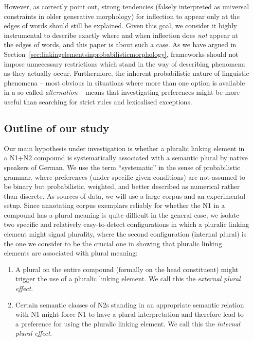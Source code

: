 However, as \citet[5]{KirchnerNicoladis2009} correctly point out, strong tendencies (falsely interpreted as universal constraints in older generative morphology) for inflection to appear only at the edges of words should still be explained.
Given this goal, we consider it highly instrumental to describe exactly where and when inflection does \textit{not} appear at the edges of words, and this paper is about such a case. %
As we have argued in Section~\ref{sec:linkingelementsinprobabilisticmorphology}, frameworks should not impose unnecessary restrictions which stand in the way of describing phenomena as they actually occur.
Furthermore, the inherent probabilistic nature of linguistic phenomena -- most obvious in situations where more than one option is available in a so-called \textit{alternation} -- means that investigating preferences might be more useful than searching for strict rules and lexicalised exceptions.

\subsection{Outline of our study}

Our main hypothesis under investigation is whether a pluralic linking element in a N1+N2 compound is systematically associated with a semantic plural by native speakers of German.
We use the term ``systematic'' in the sense of probabilistic grammar, where preferences (under specific given conditions) are not assumed to be binary but probabilistic, weighted, and better described as numerical rather than discrete.
As sources of data, we will use a large corpus and an experimental setup.
Since annotating corpus exemplars reliably for whether the N1 in a compound has a plural meaning is quite difficult in the general case, we isolate two specific and relatively easy-to-detect configurations in which a pluralic linking element might signal plurality, where the second configuration (internal plural) is the one we consider to be the crucial one in showing that pluralic linking elements are associated with plural meaning:

\vspace{\baselineskip}

\begin{enumerate}
  \item A plural on the entire compound (formally on the head constituent) might trigger the use of a pluralic linking element.
  We call this the \textit{external plural effect}.
  \item Certain semantic classes of N2s standing in an appropriate semantic relation with N1 might force N1 to have a plural interpretation and therefore lead to a preference for using the pluralic linking element.
  We call this the \textit{internal plural effect}.
\end{enumerate}

